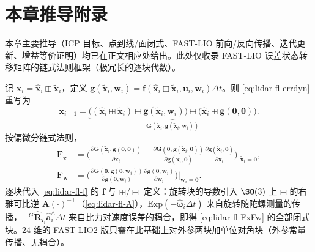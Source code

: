 \section{本章推导附录}
\label{sec:lidar-appendix}

本章主要推导（ICP 目标、点到线/面闭式、FAST-LIO 前向/反向传播、迭代更新、增益等价证明）均已在正文相应处给出。此处仅收录 FAST-LIO 误差状态转移矩阵的链式法则框架（极冗长的逐块代数）。

\begin{derivation}
记 $\mathbf{x}_i=\hat{\mathbf{x}}_i\boxplus\tilde{\mathbf{x}}_i$，定义 $\mathbf{g}(\tilde{\mathbf{x}}_i,\mathbf{w}_i)=\mathbf{f}(\hat{\mathbf{x}}_i\boxplus\tilde{\mathbf{x}}_i,\mathbf{u}_i,\mathbf{w}_i)\Delta t$。则 \cref{eq:lidar-fl-errdyn} 重写为
\[
  \tilde{\mathbf{x}}_{i+1}=\underbrace{\big((\hat{\mathbf{x}}_i\boxplus\tilde{\mathbf{x}}_i)\boxplus\mathbf{g}(\tilde{\mathbf{x}}_i,\mathbf{w}_i)\big)\boxminus\big(\hat{\mathbf{x}}_i\boxplus\mathbf{g}(\mathbf{0},\mathbf{0})\big)}_{\mathbf{G}(\tilde{\mathbf{x}}_i,\mathbf{g}(\tilde{\mathbf{x}}_i,\mathbf{w}_i))}.
\]
按偏微分链式法则，
\begin{align*}
\mathbf{F}_{\tilde{\mathbf{x}}}&=\Big(\frac{\partial\mathbf{G}(\tilde{\mathbf{x}}_i,\mathbf{g}(\mathbf{0},\mathbf{0}))}{\partial\tilde{\mathbf{x}}_i}+\frac{\partial\mathbf{G}(\mathbf{0},\mathbf{g}(\tilde{\mathbf{x}}_i,\mathbf{0}))}{\partial\mathbf{g}(\tilde{\mathbf{x}}_i,\mathbf{0})}\frac{\partial\mathbf{g}(\tilde{\mathbf{x}}_i,\mathbf{0})}{\partial\tilde{\mathbf{x}}_i}\Big)\Big|_{\tilde{\mathbf{x}}_i=\mathbf{0}},\\
\mathbf{F}_{\mathbf{w}}&=\Big(\frac{\partial\mathbf{G}(\mathbf{0},\mathbf{g}(\mathbf{0},\mathbf{w}_i))}{\partial\mathbf{g}(\mathbf{0},\mathbf{w}_i)}\frac{\partial\mathbf{g}(\mathbf{0},\mathbf{w}_i)}{\partial\mathbf{w}_i}\Big)\Big|_{\mathbf{w}_i=\mathbf{0}}.
\end{align*}
逐块代入 \cref{eq:lidar-fl-f} 的 $\mathbf{f}$ 与 $\boxplus/\boxminus$ 定义：旋转块的导数引入 $\SO(3)$ 上 $\boxminus$ 的右雅可比逆 $\mathbf{A}(\cdot)^{-\top}$（\cref{eq:lidar-fl-A}），$\mathrm{Exp}(-\hat{\boldsymbol{\omega}}_i\Delta t)$ 来自旋转随陀螺测量的传播，$-{}^G\hat{\mathbf{R}}_{I_i}\hat{\mathbf{a}}_i^\wedge\Delta t$ 来自比力对速度误差的耦合，即得 \cref{eq:lidar-fl-FxFw} 的全部闭式块。$24$ 维的 FAST-LIO2 版只需在此基础上对外参两块加单位对角块（外参常量传播、无耦合）。
\end{derivation}


